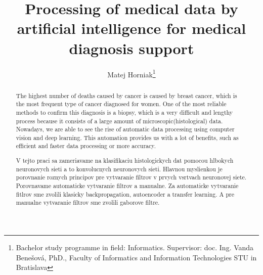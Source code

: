 \documentclass[runningheads]{llncs}
\begin{document}
%
\title{Processing of medical data by artificial intelligence for medical diagnosis support}
%
%
\author{Matej Horniak\thanks{Bachelor study programme in field: Informatics.
Supervisor: doc. Ing. Vanda Benešová, PhD., Faculty of Informatics
and Information Technologies STU in Bratislava }
}


%
%
\maketitle              %
%
\begin{abstract}
The highest number of deaths caused by cancer is caused by breast cancer, which is the most frequent type of cancer diagnosed for women. One of the most reliable methods to confirm this diagnosis is a biopsy, which is a very difficult and lengthy process because it consists of a large amount of microscopic(histological) data. Nowadays, we are able to see the rise of automatic data processing using computer vision and deep learning. This automation provides us with a lot of benefits, such as efficient and faster data processing or more accuracy. 

V tejto praci sa zameriavame na klasifikaciu histologickych dat pomocou hlbokych neuronovych sieti a to konvolucnych neuronovych sieti. Hlavnou myslienkou je porovnanie roznych principov pre vytvaranie filtrov v prvych vsrtvach neuronovej siete. Porovnavame automaticke vytvaranie filtrov a manualne. Za automaticke vytvaranie fitlrov sme zvolili klasicky backpropagation, autoencoder a transfer learning. A pre manualne vytvaranie filtrov sme zvolili gaborove filtre.  
\end{abstract}
%
%
%
\end{document}
